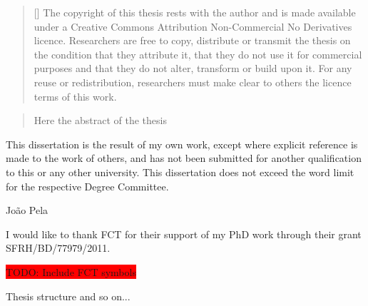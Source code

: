 
\begin{abstract}[]
The copyright of this thesis rests with the author and is made available under a
Creative Commons Attribution Non-Commercial No Derivatives licence. Researchers
are free to copy, distribute or transmit the thesis on the condition that they
attribute it, that they do not use it for commercial purposes and that they do
not alter, transform or build upon it. For any reuse or redistribution,
researchers must make clear to others the licence terms of this work.
\end{abstract}
  
\begin{abstract}%
Here the abstract of the thesis
\end{abstract}


\begin{declaration}
  This dissertation is the result of my own work, except where explicit
  reference is made to the work of others, and has not been submitted
  for another qualification to this or any other university. This
  dissertation does not exceed the word limit for the respective Degree
  Committee.
  \vspace*{1cm}
  \begin{flushright}
    João Pela
  \end{flushright}
\end{declaration}


\begin{acknowledgements}
I would like to thank FCT for their support of my PhD work through their grant SFRH/BD/77979/2011. 

\colorbox{red}{TODO: Include FCT symbols}
\end{acknowledgements}

\begin{preface}
Thesis structure and so on...
\end{preface}

\dedication{To my grand mother}


\tableofcontents
\listoffigures
\listoftables

 
